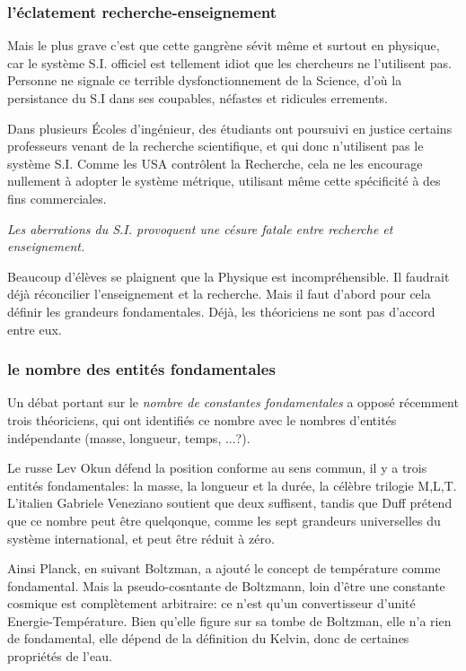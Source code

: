 \documentclass[a4paper,12pt]{article}
\begin{document}
\subsubsection{l'éclatement recherche-enseignement}

Mais le plus grave c'est que cette gangrène sévit même et surtout en physique, car le système S.I. officiel est tellement idiot que les chercheurs ne l'utilisent pas. Personne ne signale ce terrible dysfonctionnement de la Science, d'où la persistance du S.I dans ses coupables, néfastes et ridicules errements.


Dans plusieurs Écoles d'ingénieur, des étudiants ont poursuivi en justice certains professeurs venant de la recherche scientifique, et qui donc n'utilisent pas le système S.I. Comme les USA contrôlent la Recherche, cela ne les encourage nullement à adopter le système métrique, utilisant même cette spécificité à des fins commerciales.


\textit{Les aberrations du S.I. provoquent une césure fatale entre recherche et enseignement.}

Beaucoup d'élèves se plaignent que la Physique est incompréhensible. Il faudrait déjà réconcilier l'enseignement et la recherche. Mais il faut d'abord pour cela définir les grandeurs fondamentales. Déjà, les théoriciens ne sont pas d'accord entre eux. 

\subsubsection{le nombre des entités fondamentales}

Un débat portant sur le \textit{nombre de constantes fondamentales} a opposé récemment trois théoriciens, qui ont identifiés ce nombre avec le nombres d'entités indépendante (masse, longueur, temps, ...?). 

Le russe Lev Okun défend la position conforme au sens commun, il y a trois entités fondamentales: la masse, la longueur et la durée, la célèbre trilogie M,L,T. L'italien Gabriele Veneziano soutient que deux suffisent, tandis que Duff prétend que ce nombre peut être quelqonque, comme les sept grandeurs universelles du système international, et peut être réduit à zéro. 

Ainsi Planck, en suivant Boltzman, a ajouté le concept de température comme fondamental. Mais la pseudo-cosntante de Boltzmann, loin d'être une constante cosmique est complètement arbitraire: ce n'est qu'un convertisseur d'unité Energie-Température. Bien qu'elle figure sur sa tombe de Boltzman, elle n'a rien de fondamental, elle dépend de la définition du Kelvin, donc de certaines propriétés de l'eau.
\end{document}
